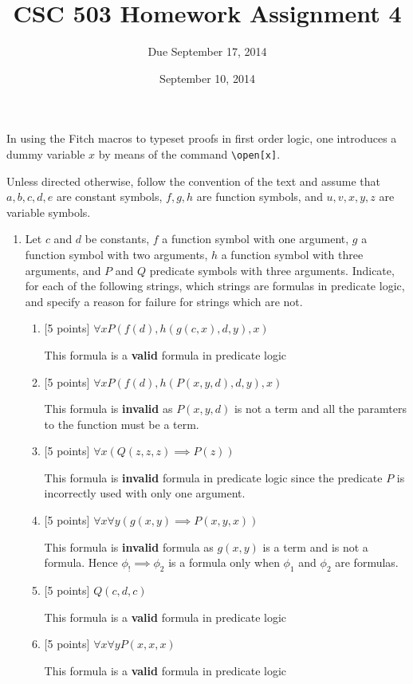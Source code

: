 \documentclass{article}
\title{CSC 503 Homework Assignment 4}
\author{Due September 17, 2014}
\date{September 10, 2014}
\begin{document}
\maketitle


In using the Fitch macros to typeset proofs in first order logic, one
introduces a dummy variable $x$ by means of the command
\verb+\open[x]+. 

Unless directed otherwise, follow the convention of the text and
assume that $a,b,c,d,e$ are constant symbols, $f,g,h$ are function
symbols, and $u,v,x,y,z$ are variable symbols.


\begin{enumerate}

\item Let $c$ and $d$ be constants, $f$ a function symbol with one
  argument, $g$ a function symbol with two arguments, $h$ a
  function symbol with three arguments, and $P$ and $Q$ predicate
  symbols with three arguments.  Indicate, for each of the following
  strings, which strings are formulas in predicate logic, and specify
  a reason for failure for strings which are not.
  \begin{enumerate}
  \item {[5 points]} $\forall x P(f(d),h(g(c,x),d,y),x)$
  \begin{answer}
  	This formula is a \textbf{valid} formula in predicate logic
  \end{answer}
  \item {[5 points]} $\forall x P(f(d),h(P(x,y,d),d,y),x)$
  \begin{answer}
  	This formula is \textbf{invalid} as $P(x,y,d)$ is not a term and all the
  	paramters to the function must be a term.
  \end{answer}
  \item {[5 points]} $\forall x (Q(z,z,z) \implies P(z))$
  \begin{answer}
  	This formula is \textbf{invalid} formula in predicate logic since the
  	predicate $P$ is incorrectly used with only one argument.
  \end{answer}
  \item {[5 points]} $\forall x \forall y (g(x,y) \implies P(x,y,x))$
  \begin{answer}
  	This formula is \textbf{invalid} formula as $g(x,y)$ is a term and is not a
  	formula. Hence $\phi_! \implies \phi_2$ is a formula only when $\phi_1$ and
  	$\phi_2$ are formulas.
  \end{answer}
  \item {[5 points]} $Q(c,d,c)$
  \begin{answer}
  	This formula is a \textbf{valid} formula in predicate logic
  \end{answer}
  \item {[5 points]} $\forall x \forall y P(x,x,x)$
  \begin{answer}
  	This formula is a \textbf{valid} formula in predicate logic
  \end{answer}
  \end{enumerate}


\end{enumerate}
\end{document}

